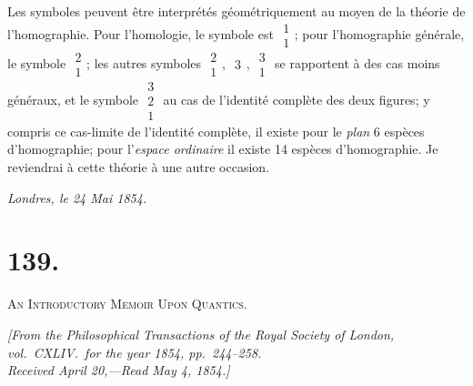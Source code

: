 \documentclass[12pt,a4paper]{article}
\begin{document}
\newpage
\setcounter{page}{220}

Les symboles peuvent \^{e}tre interpr\'{e}t\'{e}s g\'{e}om\'{e}triquement au moyen de la th\'{e}orie de l'homographie. Pour l'homologie, le symbole est $\begin{array}{c} 1 \\ 1 \end{array}$; pour l'homographie g\'{e}n\'{e}rale, le symbole $\begin{array}{c} 2 \\ 1 \end{array}$; les autres symboles $\begin{array}{c} 2 \\ 1 \end{array}$, $\begin{array}{c} 3 \end{array}$, $\begin{array}{c} 3 \\ 1 \end{array}$ se rapportent \`{a} des cas moins g\'{e}n\'{e}raux, et le symbole $\begin{array}{c} 3 \\ 2 \\ 1 \end{array}$ au cas de l'identit\'{e} compl\`{e}te des deux figures; y compris ce cas-limite de l'identit\'{e} compl\`{e}te, il existe pour le \textit{plan} 6 esp\`{e}ces d'homographie; pour l'\textit{espace ordinaire} il existe 14 esp\`{e}ces d'homographie. Je reviendrai \`{a} cette th\'{e}orie \`{a} une autre occasion.

\begin{flushright}
\textit{Londres, le 24 Mai 1854.}
\end{flushright}

\newpage
\setcounter{page}{221}


\section*{139.}

\textsc{An Introductory Memoir Upon Quantics.}

\begin{flushright}
\textit{[From the Philosophical Transactions of the Royal Society of London,}\\
\textit{vol.\ CXLIV.\ for the year 1854, pp.\ 244--258.}\\
\textit{Received April 20,---Read May 4, 1854.]}
\end{flushright}
\end{document}
